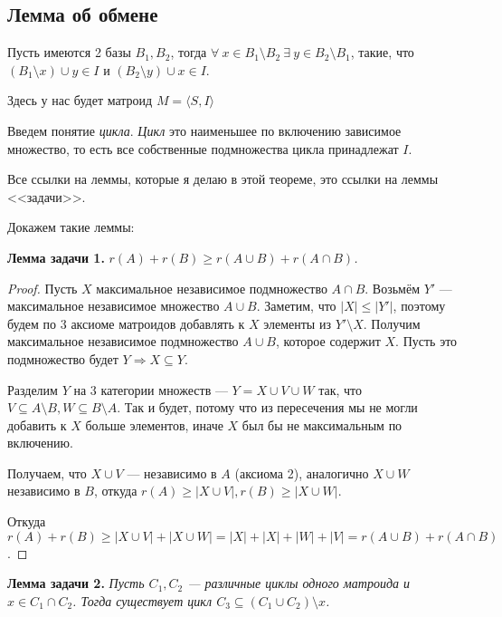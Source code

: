\documentclass[a4paper, 12pt]{article}
\begin{document}
\subsection{Лемма об обмене}

\begin{Lemma}
  Пусть имеются 2 базы $B_1, B_2$, тогда $\forall \ x \in B_1 \setminus B_2
  \ \exists \ y \in B_2 \setminus B_1$, такие, что $(B_1 \setminus x) \cup y \in I$ и
  $(B_2 \setminus y) \cup x \in I$.
\end{Lemma}

Здесь у нас будет матроид $M = \langle S, I \rangle$

Введем понятие {\it цикла}. {\it Цикл} это наименьшее по включению зависимое
множество, то есть все собственные подмножества цикла принадлежат $I$.

Все ссылки на леммы, которые я делаю в этой теореме, это ссылки
на леммы <<задачи>>.

Докажем такие леммы:

{\bf Лемма задачи 1.} {\it $r(A) + r(B) \geqslant r(A \cup B) + r(A \cap B)$.}

\begin{proof}
  Пусть $X$ максимальное независимое подмножество $A \cap B$. Возьмём $Y'$ ---
  максимальное независимое множество $A \cup B$. Заметим, что $|X| \leqslant 
  |Y'|$, поэтому будем по 3 аксиоме матроидов добавлять к $X$ элементы из $Y' 
  \setminus X$. Получим максимальное независимое подмножество $A \cup B$, которое
  содержит $X$. Пусть это подмножество будет $Y \Rightarrow X \subseteq Y$.

  Разделим $Y$ на 3 категории множеств --- $Y = X \cup V \cup W$ так, что
  $V \subseteq A \setminus B, W \subseteq B \setminus A$. Так и будет, потому
  что из пересечения мы не могли добавить к $X$ больше элементов, иначе $X$ был
  бы не максимальным по включению.

  Получаем, что $X \cup V$ --- независимо в $A$ (аксиома 2), аналогично $X \cup W$
  независимо в $B$, откуда $r(A) \geqslant |X \cup V|, r(B) \geqslant |X \cup W|$.

  Откуда $r(A) + r(B) \geqslant |X \cup V| + |X \cup W| = |X| + |X| + |W| + |V| =
  r(A \cup B) + r(A \cap B)$.
\end{proof}

{\bf Лемма задачи 2.} {\it Пусть $C_1, C_2$ --- различные циклы одного матроида и $x \in
C_1 \cap C_2$. Тогда существует цикл $C_3 \subseteq (C_1 \cup C_2) \setminus x$.}
\end{document}
